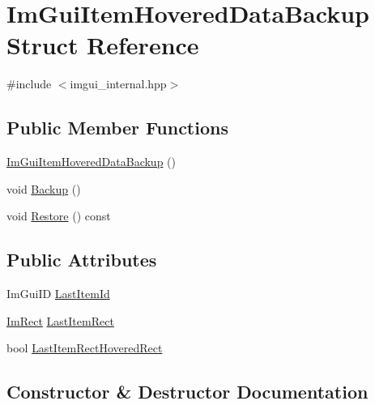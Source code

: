 \hypertarget{struct_im_gui_item_hovered_data_backup}{}\section{Im\+Gui\+Item\+Hovered\+Data\+Backup Struct Reference}
\label{struct_im_gui_item_hovered_data_backup}


{\ttfamily \#include $<$imgui\+\_\+internal.\+hpp$>$}

\subsection*{Public Member Functions}
\begin{DoxyCompactItemize}
\item 
\hyperlink{struct_im_gui_item_hovered_data_backup_a242a83a1258e1366ebfecce938c83604}{Im\+Gui\+Item\+Hovered\+Data\+Backup} ()
\item 
void \hyperlink{struct_im_gui_item_hovered_data_backup_a2084500d9cbc9455e52fbe87c95f2315}{Backup} ()
\item 
void \hyperlink{struct_im_gui_item_hovered_data_backup_ae812e9cff1c84c7b438a5af502d778f5}{Restore} () const
\end{DoxyCompactItemize}
\subsection*{Public Attributes}
\begin{DoxyCompactItemize}
\item 
Im\+Gui\+ID \hyperlink{struct_im_gui_item_hovered_data_backup_a5e0b18013d983269deba7976666fc501}{Last\+Item\+Id}
\item 
\hyperlink{struct_im_rect}{Im\+Rect} \hyperlink{struct_im_gui_item_hovered_data_backup_ae489c222bed561950104a46ddf1387f3}{Last\+Item\+Rect}
\item 
bool \hyperlink{struct_im_gui_item_hovered_data_backup_a48dd47c573d5299de25be908d77f23f0}{Last\+Item\+Rect\+Hovered\+Rect}
\end{DoxyCompactItemize}


\subsection{Constructor \& Destructor Documentation}
\hypertarget{struct_im_gui_item_hovered_data_backup_a242a83a1258e1366ebfecce938c83604}{}\label{struct_im_gui_item_hovered_data_backup_a242a83a1258e1366ebfecce938c83604} 
